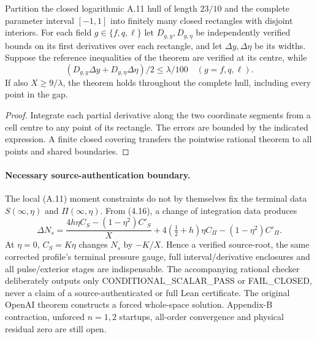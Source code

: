 \begin{proposition}
\label{prop:a11-full-hull-lipschitz-20261021}
Partition the closed logarithmic A.11 hull of length $23/10$
and the complete parameter interval $[-1,1]$ into finitely many
closed rectangles with disjoint interiors.
For each field $g\in\{f,q,\ell\}$ let $D_{g,y},D_{g,\eta}$
be independently verified bounds on its first derivatives
over each rectangle, and let $\Delta y,\Delta\eta$ be its widths.
Suppose the reference inequalities of the theorem are verified
at its centre, while
\[
 (D_{g,y}\Delta y+D_{g,\eta}\Delta\eta)/2
 \le\lambda/100\quad(g=f,q,\ell).
\]
If also $X\ge9/\lambda$, the theorem holds throughout the
complete hull, including every point in the gap.
\end{proposition}
\begin{proof}
Integrate each partial derivative along the two coordinate
segments from a cell centre to any point of its rectangle.
The errors are bounded by the indicated expression. A finite
closed covering transfers the pointwise rational theorem to
all points and shared boundaries.
\end{proof}

\paragraph{Necessary source-authentication boundary.}
The local (A.11) moment constraints do not by themselves fix
the terminal data $S(\infty,\eta)$ and $\Pi(\infty,\eta)$.
From (4.16), a change of integration data produces
\[
 \Delta N_s=
 \frac{4h\eta C_S-(1-\eta^2)C'_S}{X}
 +4(\tfrac12+h)\eta C_\Pi-(1-\eta^2)C'_\Pi.
\]
At $\eta=0$, $C_S=K\eta$ changes $N_s$ by $-K/X$.
Hence a verified source-root, the same corrected profile's
terminal pressure gauge, full interval/derivative enclosures
and all pulse/exterior stages are indispensable.
The accompanying rational checker deliberately outputs only
CONDITIONAL\_SCALAR\_PASS or FAIL\_CLOSED, never a claim
of a source-authenticated or full Lean certificate.
The original OpenAI theorem constructs a forced whole-space
solution. Appendix-B contraction, unforced $n=1,2$ startups,
all-order convergence and physical residual zero are still open.
